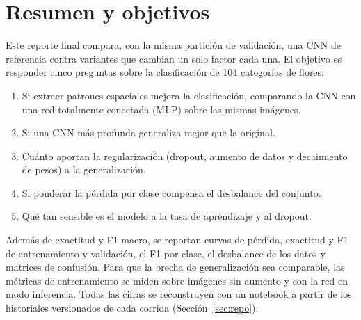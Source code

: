 \section{Resumen y objetivos}

Este reporte final compara, con la misma partición de validación, una CNN de
referencia contra variantes que cambian un solo factor cada una. El objetivo es
responder cinco preguntas sobre la clasificación de 104 categorías de flores:

\begin{enumerate}
\item Si extraer patrones espaciales mejora la clasificación, comparando la CNN
con una red totalmente conectada (MLP) sobre las mismas imágenes.
\item Si una CNN más profunda generaliza mejor que la original.
\item Cuánto aportan la regularización (dropout, aumento de datos y decaimiento
de pesos) a la generalización.
\item Si ponderar la pérdida por clase compensa el desbalance del conjunto.
\item Qué tan sensible es el modelo a la tasa de aprendizaje y al dropout.
\end{enumerate}

Además de exactitud y F1 macro, se reportan curvas de pérdida, exactitud y F1
de entrenamiento y validación, el F1 por clase, el desbalance de los datos y
matrices de confusión. Para que la brecha de generalización sea comparable,
las métricas de entrenamiento se miden sobre imágenes sin aumento y con la red
en modo inferencia. Todas las cifras se reconstruyen con un notebook a partir de
los historiales versionados de cada corrida (Sección~\ref{sec:repo}).
